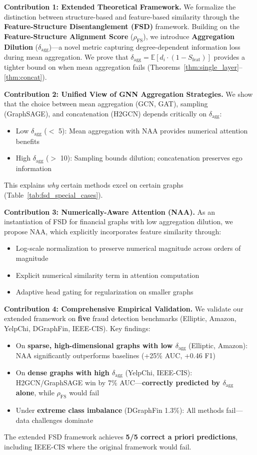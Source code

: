 \textbf{Contribution 1: Extended Theoretical Framework.} We formalize the distinction between structure-based and feature-based similarity through the \textbf{Feature-Structure Disentanglement (FSD)} framework. Building on the \textbf{Feature-Structure Alignment Score} ($\rho_{\text{FS}}$), we introduce \textbf{Aggregation Dilution} ($\delta_{\text{agg}}$)---a novel metric capturing degree-dependent information loss during mean aggregation. We prove that $\delta_{\text{agg}} = \mathbb{E}[d_i \cdot (1 - S_{\text{feat}})]$ provides a tighter bound on when mean aggregation fails (Theorems~\ref{thm:single_layer}--\ref{thm:concat}).

\textbf{Contribution 2: Unified View of GNN Aggregation Strategies.} We show that the choice between mean aggregation (GCN, GAT), sampling (GraphSAGE), and concatenation (H2GCN) depends critically on $\delta_{\text{agg}}$:
\begin{itemize}
    \item Low $\delta_{\text{agg}}$ ($<$ 5): Mean aggregation with NAA provides numerical attention benefits
    \item High $\delta_{\text{agg}}$ ($>$ 10): Sampling bounds dilution; concatenation preserves ego information
\end{itemize}
This explains \textit{why} certain methods excel on certain graphs (Table~\ref{tab:fsd_special_cases}).

\textbf{Contribution 3: Numerically-Aware Attention (NAA).} As an instantiation of FSD for financial graphs with low aggregation dilution, we propose NAA, which explicitly incorporates feature similarity through:
\begin{itemize}
    \item Log-scale normalization to preserve numerical magnitude across orders of magnitude
    \item Explicit numerical similarity term in attention computation
    \item Adaptive head gating for regularization on smaller graphs
\end{itemize}

\textbf{Contribution 4: Comprehensive Empirical Validation.} We validate our extended framework on \textbf{five} fraud detection benchmarks (Elliptic, Amazon, YelpChi, DGraphFin, IEEE-CIS). Key findings:
\begin{itemize}
    \item On \textbf{sparse, high-dimensional graphs with low $\delta_{\text{agg}}$} (Elliptic, Amazon): NAA significantly outperforms baselines (+25\% AUC, +0.46 F1)
    \item On \textbf{dense graphs with high $\delta_{\text{agg}}$} (YelpChi, IEEE-CIS): H2GCN/GraphSAGE win by 7\% AUC---\textbf{correctly predicted by $\delta_{\text{agg}}$ alone}, while $\rho_{\text{FS}}$ would fail
    \item Under \textbf{extreme class imbalance} (DGraphFin 1.3\%): All methods fail---data challenges dominate
\end{itemize}
The extended FSD framework achieves \textbf{5/5 correct a priori predictions}, including IEEE-CIS where the original framework would fail.

